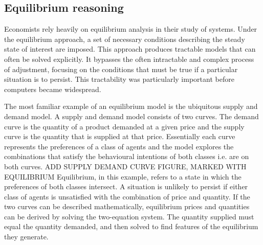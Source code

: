 

\subsection{Equilibrium reasoning }
Economists rely heavily on equilibrium analysis in their study of systems. 
Under the equilibrium approach, a set of necessary conditions describing the steady state of interest are imposed. This approach produces tractable models that can often be solved explicitly. It %
bypasses the often intractable and complex process of adjustment, focusing on the conditions that must be true if a particular situation is to persist. This tractability was particularly important before computers became widespread.

The most familiar example of an equilibrium model is the ubiquitous supply and demand model. A supply and demand model consists of two curves. The demand curve is the quantity of a product demanded at a given price and the supply curve is the quantity that is supplied at that price. Essentially each curve represents the preferences of a class of agents and the model explores the combinations that satisfy the behavioural intentions of both classes i.e. are on both curves. {\color{red} ADD SUPPLY DEMAND CURVE FIGURE, MARKED WITH EQUILIBRIUM} Equilibrium, in this example, refers to a state in which the preferences of both classes intersect. A situation is unlikely to persist if either class of agents is unsatisfied with the combination of price and quantity.  If the two curves can be described mathematically, equilibrium prices and quantities can be derived by solving the two-equation system. The quantity supplied must equal the quantity demanded, and then solved to find features of the equilibrium they generate. 


